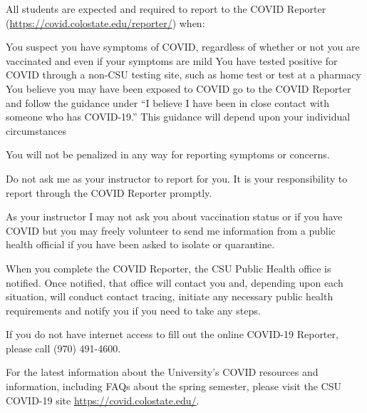 \documentclass[12pt]{amsbook}
\begin{document}
All students are expected and required to report to the COVID Reporter (\url{https://covid.colostate.edu/reporter/}) when:



You suspect you have symptoms of COVID, regardless of whether or not you are vaccinated and even if your symptoms are mild
You have tested positive for COVID through a non-CSU testing site, such as home test or test at a pharmacy
You believe you may have been exposed to COVID go to the COVID Reporter and follow the guidance under “I believe I have been in close contact with someone who has COVID-19.” This guidance will depend upon your individual circumstances


You will not be penalized in any way for reporting symptoms or concerns.



Do not ask me as your instructor to report for you. It is your responsibility to report through the COVID Reporter promptly.



As your instructor I may not ask you about vaccination status or if you have COVID but you may freely volunteer to send me information from a public health official   if you have been asked to isolate or quarantine.



When you complete the COVID Reporter, the CSU Public Health office is notified. Once notified, that office will contact you and, depending upon each situation, will conduct contact tracing, initiate any necessary public health requirements and notify you if you need to take any steps.



If you do not have internet access to fill out the online COVID-19 Reporter, please call (970) 491-4600.



For the latest information about the University’s COVID resources and information, including FAQs about the spring semester, please visit the CSU COVID-19 site \url{https://covid.colostate.edu/}.
\end{document}
